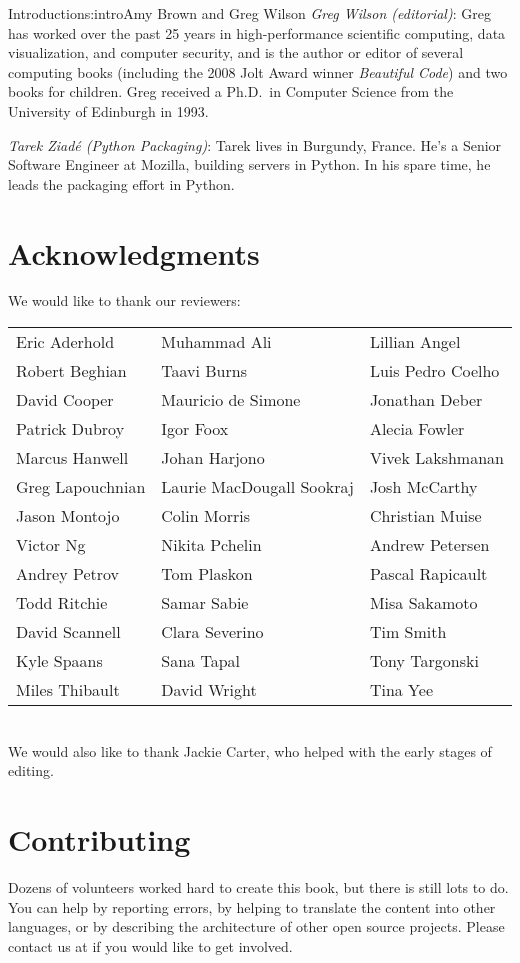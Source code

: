 \begin{aosachapter}{Introduction}{s:intro}{Amy Brown and Greg Wilson}
\emph{Greg Wilson (editorial)}: Greg has worked over the
past 25 years in high-performance scientific computing, data
visualization, and computer security, and is the author or editor
of several computing books (including the 2008 Jolt Award
winner \emph{Beautiful Code}) and two books for children.
Greg received a Ph.D.\ in Computer Science from the University of
Edinburgh in 1993.

\emph{Tarek Ziad\'{e} (Python Packaging)}: Tarek lives in Burgundy, France.
He's a Senior Software Engineer at Mozilla, building servers in Python. In his
spare time, he leads the packaging effort in Python.

\section*{Acknowledgments}

We would like to thank our reviewers:\\

\begin{tabular}{lll}
Eric Aderhold		& Muhammad Ali			& Lillian Angel		\\
Robert Beghian		& Taavi Burns			& Luis Pedro Coelho	\\
David Cooper		& Mauricio de Simone		& Jonathan Deber	\\
Patrick Dubroy		& Igor Foox			& Alecia Fowler		\\
Marcus Hanwell		& Johan Harjono			& Vivek Lakshmanan	\\
Greg Lapouchnian	& Laurie MacDougall Sookraj	& Josh McCarthy		\\
Jason Montojo		& Colin Morris			& Christian Muise	\\
Victor Ng		& Nikita Pchelin		& Andrew Petersen	\\
Andrey Petrov		& Tom Plaskon			& Pascal Rapicault	\\
Todd Ritchie		& Samar Sabie			& Misa Sakamoto		\\
David Scannell		& Clara Severino		& Tim Smith		\\
Kyle Spaans		& Sana Tapal			& Tony Targonski	\\
Miles Thibault		& David Wright			& Tina Yee
\end{tabular}

~\\

\noindent We would also like to thank Jackie Carter, who helped with the early stages of editing.

\section*{Contributing}

Dozens of volunteers worked hard to create this book, but there is
still lots to do.  You can help by reporting errors, by helping to
translate the content into other languages, or by describing the
architecture of other open source projects.  Please contact us at
 if you would like to get involved.

\end{aosachapter}
